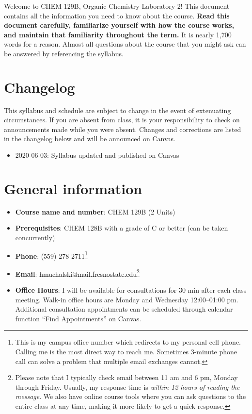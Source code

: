 \newpage

Welcome to CHEM 129B, Organic Chemistry Laboratory 2! This document
contains all the information you need to know about the course.
\textbf{Read this document carefully, familiarize yourself with how the
course works, and maintain that familiarity throughout the term.} It is
nearly 1,700 words for a reason. Almost all questions about the course
that you might ask can be answered by referencing the syllabus.

\hypertarget{changelog}{%
\section{Changelog}\label{changelog}}

This syllabus and schedule are subject to change in the event of
extenuating circumstances. If you are absent from class, it is your
responsibility to check on announcements made while you were absent.
Changes and corrections are listed in the changelog below and will be
announced on Canvas.

\begin{itemize}
\tightlist
\item
  2020-06-03: Syllabus updated and published on Canvas
\end{itemize}

\hypertarget{general-information}{%
\section{General information}\label{general-information}}

\begin{itemize}
\tightlist
\item
  \textbf{Course name and number}: CHEM 129B (2 Units)
\item
  \textbf{Prerequisites}: CHEM 128B with a grade of C or better (can be
  taken concurrently) 
\item
  \textbf{Phone}: (559) 278-2711\footnote{This is my campus office
    number which redirects to my personal cell phone. Calling me is the
    most direct way to reach me. Sometimes 3-minute phone call can solve
    a problem that multiple email exchanges cannot.}
\item
  \textbf{Email}: \url{hmuchalski@mail.fresnostate.edu}\footnote{Please
    note that I typically check email between 11 am and 6 pm, Monday
    through Friday. Usually, my response time is \emph{within 12 hours
    of reading the message}. We also have online course tools where you
    can ask questions to the entire class at any time, making it more
    likely to get a quick response.}
\item
  \textbf{Office Hours}: I will be available for consultations for 30
  min after each class meeting. Walk-in office hours are Monday and
  Wednesday 12:00--01:00 pm. Additional consultation appointments can be
  scheduled through calendar function ``Find Appointments'' on Canvas.
\end{itemize}

